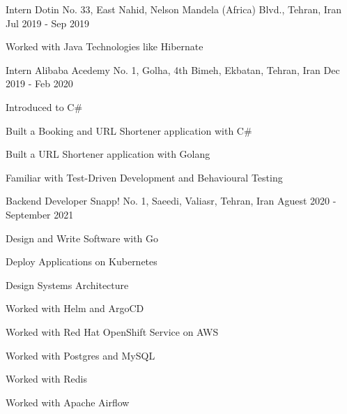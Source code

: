 

\begin{cventries}

  \cventry
    {Intern} %
    {Dotin} %
    {No. 33, East Nahid, Nelson Mandela (Africa) Blvd., Tehran, Iran} %
    {Jul 2019 - Sep 2019} %
    {
      \begin{cvitems} %
        \item {Worked with Java Technologies like Hibernate}
      \end{cvitems}
    }

  \cventry
    {Intern} %
    {Alibaba Acedemy} %
    {No. 1, Golha, 4th Bimeh, Ekbatan, Tehran, Iran} %
    {Dec 2019 - Feb 2020} %
    {
      \begin{cvitems} %
        \item {Introduced to C\#}
        \item {Built a Booking and URL Shortener application with C\#}
        \item {Built a URL Shortener application with Golang}
        \item {Familiar with Test-Driven Development and Behavioural Testing}
      \end{cvitems}
    }

  \cventry
    {Backend Developer} %
    {Snapp!} %
    {No. 1, Saeedi, Valiasr, Tehran, Iran} %
    {Aguest 2020 - September 2021} %
    {
      \begin{cvitems} %
        \item {Design and Write Software with Go}
        \item {Deploy Applications on Kubernetes}
        \item {Design Systems Architecture}
        \item {Worked with Helm and ArgoCD}
        \item {Worked with Red Hat OpenShift Service on AWS}
        \item {Worked with Postgres and MySQL}
        \item {Worked with Redis}
        \item {Worked with Apache Airflow}
      \end{cvitems}
    }


\end{cventries}
